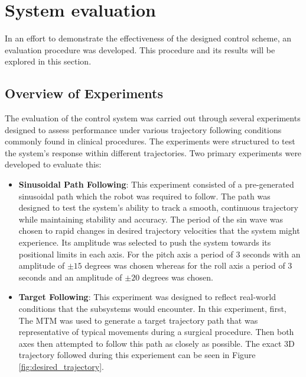 \chapter{System evaluation}
\label{chapter:results}

In an effort to demonstrate the effectiveness of the designed control scheme, an evaluation procedure was developed. This procedure and its results will be explored in this section.


\section{Overview of Experiments}
\label{section:experiment_overview}

The evaluation of the control system was carried out through several experiments designed to assess performance under various trajectory following conditions commonly found in clinical procedures. The experiments were structured to test the system's response within different trajectories. Two primary experiments were developed to evaluate this:

\begin{itemize}
    \item \textbf{Sinusoidal Path Following}: This experiment consisted of a pre-generated sinusoidal path which the robot was required to follow. The path was designed to test the system's ability to track a smooth, continuous trajectory while maintaining stability and accuracy. The period of the sin wave was chosen to rapid changes in desired trajectory velocities that the system might experience. Its amplitude was selected to push the system towards its positional limits in each axis. For the pitch axis a period of 3 seconds with an amplitude of $\pm 15$ degrees was chosen whereas for the roll axis a period of 3 seconds and an amplitude of $\pm 20$ degrees was chosen.
    
    \item \textbf{Target Following}: This experiment was designed to reflect real-world conditions that the subsystems would encounter. In this experiment, first, The MTM was used to generate a target trajectory path that was representative of typical movements during a surgical procedure. Then both axes then attempted to follow this path as closely as possible. The exact 3D trajectory followed during this experiement can be seen in Figure \ref{fig:desired_trajectory}.
\end{itemize}

